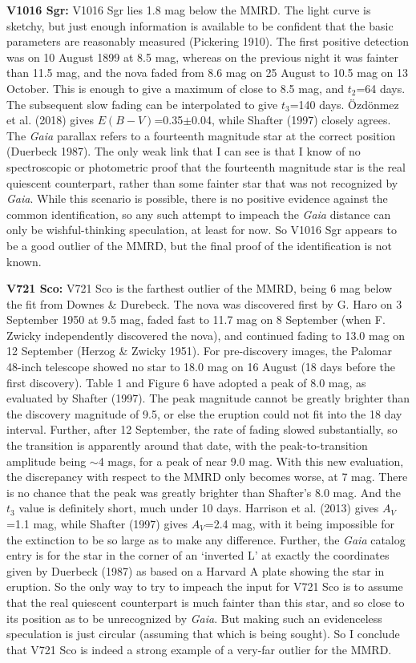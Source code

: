 \documentclass[a4paper,fleqn,usenatbib]{mnras}
\begin{document}
	{\bf V1016 Sgr:}  V1016 Sgr lies 1.8 mag below the MMRD.  The light curve is sketchy, but just enough information is available to be confident that the basic parameters are reasonably measured (Pickering 1910).  The first positive detection was on 10 August 1899 at 8.5 mag, whereas on the previous night it was fainter than 11.5 mag, and the nova faded from 8.6 mag on 25 August to 10.5 mag on 13 October.  This is enough to give a maximum of close to 8.5 mag, and $t_2$=64 days.  The subsequent slow fading can be interpolated to give $t_3$=140 days.  \"{O}zd\"{o}nmez et al. (2018) gives $E(B-V)$=0.35$\pm$0.04, while Shafter (1997) closely agrees.  The {\it Gaia} parallax refers to a fourteenth magnitude star at the correct position (Duerbeck 1987).  The only weak link that I can see is that I know of no spectroscopic or photometric proof that the fourteenth magnitude star is the real quiescent counterpart, rather than some fainter star that was not recognized by {\it Gaia}.  While this scenario is possible, there is no positive evidence against the common identification, so any such attempt to impeach the {\it Gaia} distance can only be wishful-thinking speculation, at least for now.  So V1016 Sgr appears to be a good outlier of the MMRD, but the final proof of the identification is not known.

	{\bf V721 Sco:}  V721 Sco is the farthest outlier of the MMRD, being 6 mag below the fit from Downes \& Durebeck.  The nova was discovered first by G. Haro on 3 September 1950 at 9.5 mag, faded fast to 11.7 mag on 8 September (when F. Zwicky independently discovered the nova), and continued fading to 13.0 mag on 12 September (Herzog \& Zwicky 1951).  For pre-discovery images, the Palomar 48-inch telescope showed no star to 18.0 mag on 16 August (18 days before the first discovery).  Table 1 and Figure 6 have adopted a peak of 8.0 mag, as evaluated by Shafter (1997).  The peak magnitude cannot be greatly brighter than the discovery magnitude of 9.5, or else the eruption could not fit into the 18 day interval.  Further, after 12 September, the rate of fading slowed substantially, so the transition is apparently around that date, with the peak-to-transition amplitude being $\sim$4 mags, for a peak of near 9.0 mag.  With this new evaluation, the discrepancy with respect to the MMRD only becomes worse, at 7 mag.  There is no chance that the peak was greatly brighter than Shafter's 8.0 mag.  And the $t_3$ value is definitely short, much under 10 days.  Harrison et al. (2013) gives $A_V$=1.1 mag, while Shafter (1997) gives $A_V$=2.4 mag, with it being impossible for the extinction to be so large as to make any difference.  Further, the {\it Gaia} catalog entry is for the star in the corner of an `inverted L' at exactly the coordinates given by Duerbeck (1987) as based on a Harvard A plate showing the star in eruption.  So the only way to try to impeach the input for V721 Sco is to assume that the real quiescent counterpart is much fainter than this star, and so close to its position as to be unrecognized by {\it Gaia}.  But making such an evidenceless speculation is just circular (assuming that which is being sought).  So I conclude that V721 Sco is indeed a strong example of a very-far outlier for the MMRD.
	
\end{document}
